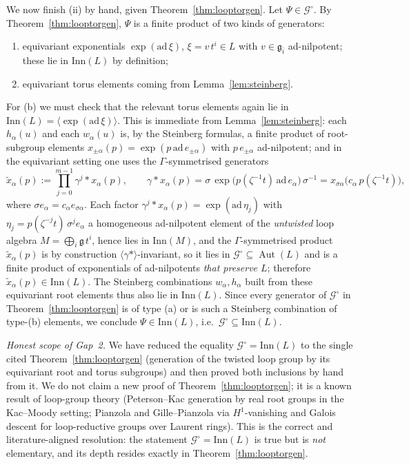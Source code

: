 \documentclass{amsart}
\theoremstyle{definition}
\DeclareMathOperator{\Aut}{Aut}
\newcommand{\g}{\mathfrak{g}}
\newcommand{\M}{M}
\begin{document}
We now finish (ii) by hand, given Theorem~\ref{thm:looptorgen}.  Let
$\Psi\in\mathcal G^\circ$.  By Theorem~\ref{thm:looptorgen}, $\Psi$ is a
finite product of two kinds of generators:
\begin{enumerate}
\item[(a)] equivariant exponentials $\exp(\mathrm{ad}\,\xi)$,
$\xi=v\,t^i\in L$ with $v\in\g_{\bar i}$ ad-nilpotent; these lie in
$\mathrm{Inn}(L)$ by definition;
\item[(b)] equivariant torus elements coming from Lemma~\ref{lem:steinberg}.
\end{enumerate}
For (b) we must check that the relevant torus elements again lie in
$\mathrm{Inn}(L)=\langle\exp(\mathrm{ad}\,\xi)\rangle$.  This is immediate
from Lemma~\ref{lem:steinberg}: each $h_\alpha(u)$ and each $w_\alpha(u)$ is,
by the Steinberg formulas, a finite product of root-subgroup elements
$x_{\pm\alpha}(p)=\exp(p\,\mathrm{ad}\,e_{\pm\alpha})$ with $p\,e_{\pm\alpha}$
ad-nilpotent; and in the equivariant setting one uses the
$\Gamma$-symmetrised generators
\[
\widetilde x_\alpha(p):=\prod_{j=0}^{m-1}\gamma^{j}\!*\!x_\alpha(p),
\qquad
\gamma\!*\!x_\alpha(p)
=\sigma\,\exp\!\bigl(p(\zeta^{-1}t)\,\mathrm{ad}\,e_\alpha\bigr)\,\sigma^{-1}
=x_{\sigma\alpha}\bigl(c_\alpha\,p(\zeta^{-1}t)\bigr),
\]
where $\sigma e_\alpha=c_\alpha e_{\sigma\alpha}$.  Each factor
$\gamma^{j}\!*\!x_\alpha(p)=\exp(\mathrm{ad}\,\eta_j)$ with $\eta_j=
p(\zeta^{-j}t)\,\sigma^{j}e_\alpha$ a homogeneous ad-nilpotent element of the
\emph{untwisted} loop algebra $\M=\bigoplus_i\g\,t^i$, hence lies in
$\mathrm{Inn}(\M)$, and the $\Gamma$-symmetrised product $\widetilde
x_\alpha(p)$ is by construction $\langle\gamma*\rangle$-invariant, so it lies
in $\mathcal G^\circ\subseteq\Aut(L)$ and is a finite product of
exponentials of ad-nilpotents \emph{that preserve $L$}; therefore
$\widetilde x_\alpha(p)\in\mathrm{Inn}(L)$.  The Steinberg combinations
$w_\alpha,h_\alpha$ built from these equivariant root elements thus also lie
in $\mathrm{Inn}(L)$.  Since every generator of $\mathcal G^\circ$ in
Theorem~\ref{thm:looptorgen} is of type (a) or is such a Steinberg
combination of type-(b) elements, we conclude $\Psi\in\mathrm{Inn}(L)$, i.e.\
$\mathcal G^\circ\subseteq\mathrm{Inn}(L)$.

\medskip
\noindent\emph{Honest scope of Gap~2.}  We have reduced the equality
$\mathcal G^\circ=\mathrm{Inn}(L)$ to the single cited
Theorem~\ref{thm:looptorgen} (generation of the twisted loop group by its
equivariant root and torus subgroups) and then proved both inclusions by
hand from it.  We do not claim a new proof of
Theorem~\ref{thm:looptorgen}; it is a known result of loop-group theory
(Peterson--Kac generation by real root groups in the Kac--Moody setting;
Pianzola and Gille--Pianzola via $H^1$-vanishing and Galois descent for
loop-reductive groups over Laurent rings).  This is the correct and
literature-aligned resolution: the statement $\mathcal G^\circ=\mathrm{Inn}(L)$
is true but is \emph{not} elementary, and its depth resides exactly in
Theorem~\ref{thm:looptorgen}.
\end{document}
